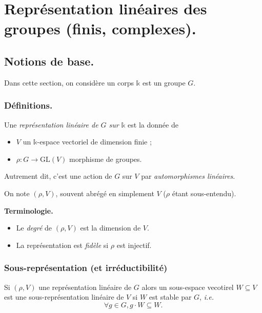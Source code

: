 \documentclass{../../notes}
\begin{document}
  \chapter{Représentation linéaires des groupes (finis, complexes).}

  \section{Notions de base.}
  Dans cette section, on considère un corps $\mathds{k}$ est un groupe $G$.

  \subsection{Définitions.}

  \begin{defn}
    Une \textit{représentation linéaire de $G$ sur $\mathds{k}$} est la donnée de
    \begin{itemize}
      \item $V$ un $\mathds{k}$-espace vectoriel de dimension finie ;
      \item $\rho : G \to \mathrm{GL}(V)$ morphisme de groupes.
    \end{itemize}
    Autrement dit, c'est une action de $G$ sur $V$ par \textit{automorphismes linéaires}.
  \end{defn}

  \begin{nota}
    On note $(\rho, V)$, souvent abrégé en simplement $V$ ($\rho$ étant sous-entendu).
  \end{nota}

  \textbf{Terminologie.}
  \begin{itemize}
    \item Le \textit{degré} de $(\rho, V)$ est la dimension de $V$.
    \item La représentation est \textit{fidèle} si $\rho$ est injectif.
  \end{itemize}

  \subsection{Sous-représentation (et irréductibilité)}
  \begin{defn}
    Si $(\rho, V)$ une représentation linéaire de $G$ alors un sous-espace vecotirel $W \subseteq V$ est une sous-représentation linéaire de $V$ si $W$ est stable par $G$, \textit{i.e.} \[
    \forall g \in G, g \cdot W \subseteq W
    .\]
  \end{defn}
\end{document}
